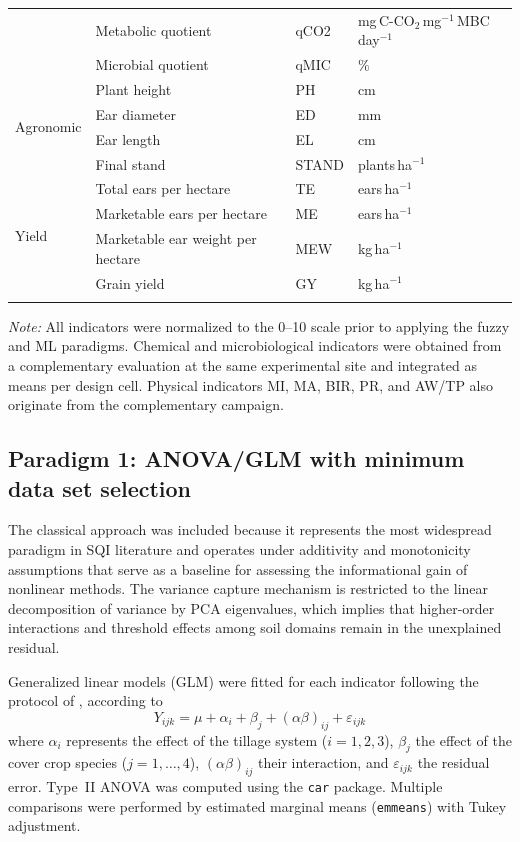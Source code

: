\documentclass[pdflatex,sn-basic]{sn-jnl}%
\begin{document}
\begin{table}[ht]
\begin{tabular*}{\textwidth}{@{\extracolsep\fill}llll}
  & Metabolic quotient & qCO2 & mg\,C-CO$_2$\,mg$^{-1}$\,MBC\,day$^{-1}$ \\
  & Microbial quotient & qMIC & \% \\
\midrule
\multirow{4}{*}{Agronomic}
  & Plant height & PH & cm \\
  & Ear diameter & ED & mm \\
  & Ear length & EL & cm \\
  & Final stand & STAND & plants\,ha$^{-1}$ \\
\midrule
\multirow{4}{*}{Yield}
  & Total ears per hectare & TE & ears\,ha$^{-1}$ \\
  & Marketable ears per hectare & ME & ears\,ha$^{-1}$ \\
  & Marketable ear weight per hectare & MEW & kg\,ha$^{-1}$ \\
  & Grain yield & GY & kg\,ha$^{-1}$ \\
\botrule
\end{tabular*}
\smallskip\noindent\textit{Note:} All indicators were normalized to the 0--10 scale prior to applying the fuzzy and ML paradigms. Chemical and microbiological indicators were obtained from a complementary evaluation \citep{Sara2019} at the same experimental site and integrated as means per design cell. Physical indicators MI, MA, BIR, PR, and AW/TP also originate from the complementary campaign.
\end{table}

\subsection{Paradigm 1: ANOVA/GLM with minimum data set selection}\label{subsec:anova}

The classical approach was included because it represents the most widespread paradigm in SQI literature and operates under additivity and monotonicity assumptions that serve as a baseline for assessing the informational gain of nonlinear methods. The variance capture mechanism is restricted to the linear decomposition of variance by PCA eigenvalues, which implies that higher-order interactions and threshold effects among soil domains remain in the unexplained residual.

Generalized linear models (GLM) were fitted for each indicator following the protocol of \cite{Andrews2002}, according to
\begin{equation}
Y_{ijk} = \mu + \alpha_i + \beta_j + (\alpha\beta)_{ij} + \varepsilon_{ijk}
\label{eq:glm}
\end{equation}
where $\alpha_i$ represents the effect of the tillage system ($i = 1, 2, 3$), $\beta_j$ the effect of the cover crop species ($j = 1, \ldots, 4$), $(\alpha\beta)_{ij}$ their interaction, and $\varepsilon_{ijk}$ the residual error. Type~II ANOVA was computed using the \texttt{car} package. Multiple comparisons were performed by estimated marginal means (\texttt{emmeans}) with Tukey adjustment.
\end{document}
